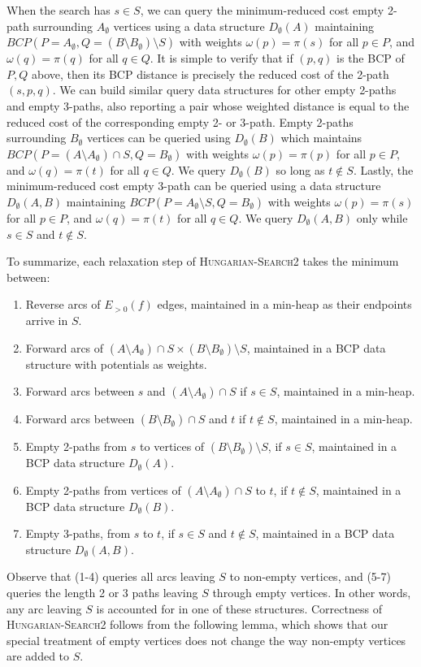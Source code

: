 \documentclass[11pt]{article}
\theoremstyle{plain}
\numberwithin{figure}{section}
\begin{document}
When the search has $s \in S$, we can query the minimum-reduced cost empty
2-path surrounding $A_\emptyset$ vertices using a data structure
$D_\emptyset(A)$ maintaining
$BCP(P = A_\emptyset, Q = (B \setminus B_\emptyset) \setminus S)$ with weights
$\omega(p) = \pi(s)$ for all $p \in P$, and $\omega(q) = \pi(q)$ for all
$q \in Q$.
It is simple to verify that if $(p, q)$ is the BCP of $P, Q$ above, then its
BCP distance is precisely the reduced cost of the 2-path $(s, p, q)$.
We can build similar query data structures for other empty 2-paths and empty
3-paths, also reporting a pair whose weighted distance is equal to the reduced
cost of the corresponding empty 2- or 3-path.
Empty 2-paths surrounding $B_\emptyset$ vertices can be queried using
$D_\emptyset(B)$ which maintains
$BCP(P = (A \setminus A_\emptyset) \cap S, Q = B_\emptyset)$ with weights
$\omega(p) = \pi(p)$ for all $p \in P$, and $\omega(q) = \pi(t)$ for all
$q \in Q$.
We query $D_\emptyset(B)$ so long as $t \not\in S$.
Lastly, the minimum-reduced cost empty 3-path can be queried using a data
structure $D_\emptyset(A, B)$ maintaining
$BCP(P = A_\emptyset \setminus S, Q = B_\emptyset)$ with weights
$\omega(p) = \pi(s)$ for all $p \in P$, and $\omega(q) = \pi(t)$ for all
$q \in Q$.
We query $D_\emptyset(A, B)$ only while $s \in S$ and $t \not\in S$.

To summarize, each relaxation step of \textsc{Hungarian-Search2} takes the
minimum between:
\begin{enumerate}
\item Reverse arcs of $E_{>0}(f)$ edges, maintained in a min-heap as their
	endpoints arrive in $S$.
\item Forward arcs of $(A \setminus A_\emptyset) \cap S \times (B \setminus B_\emptyset) \setminus S$,
	maintained in a BCP data structure with potentials as weights.
\item Forward arcs between $s$ and $(A \setminus A_\emptyset) \cap S$ if
	$s \in S$, maintained in a min-heap.
\item Forward arcs between $(B \setminus B_\emptyset) \cap S$ and $t$ if
	$t \not\in S$, maintained in a min-heap.
\item Empty 2-paths from $s$ to vertices of $(B \setminus B_\emptyset) \setminus S$, if
	$s \in S$, maintained in a BCP data structure $D_\emptyset(A)$.
\item Empty 2-paths from vertices of $(A \setminus A_\emptyset) \cap S$ to $t$, if
	$t \not\in S$, maintained in a BCP data structure $D_\emptyset(B)$.
\item Empty 3-paths, from $s$ to $t$, if $s \in S$ and $t \not\in S$,
	maintained in a BCP data structure $D_\emptyset(A, B)$.
\end{enumerate}
Observe that (1-4) queries all arcs leaving $S$ to non-empty vertices, and
(5-7) queries the length 2 or 3 paths leaving $S$ through empty vertices.
In other words, any arc leaving $S$ is accounted for in one of these
structures.
Correctness of \textsc{Hungarian-Search2} follows from the following lemma,
which shows that our special treatment of empty vertices does not change the
way non-empty vertices are added to $S$.
\end{document}
